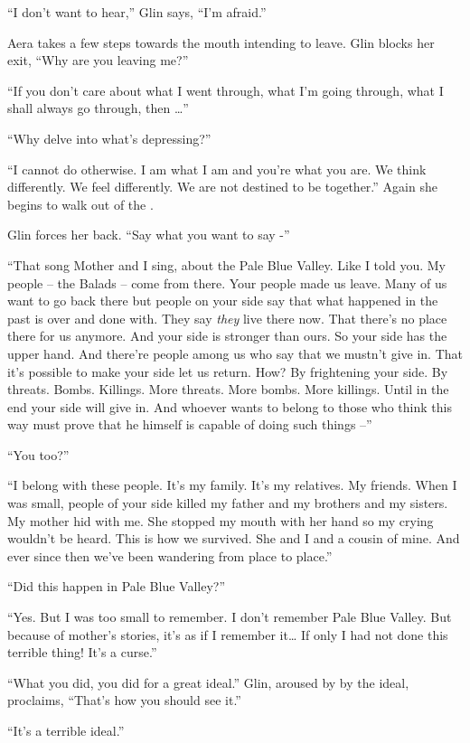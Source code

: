 \documentclass[twoside,11pt]{book}
\begin{document}
``I don't want to hear,'' Glin says, ``I'm afraid.''

Aera takes a few steps towards the mouth intending to leave. Glin blocks her exit, ``Why
are you leaving me?''

``If you don't care about what I went through, what I'm going through, what I shall always go through, then
{\dots}''

``Why delve into what's depressing?''

``I cannot do otherwise. I am what I am and you're what you are. We think differently. We feel differently.
We are not destined to be together.'' Again she begins to walk out of the .

Glin forces her back. ``Say what you want to say -''

``That song Mother and I sing, about the Pale Blue Valley. Like I told you. My people -- the Balads -- come
from there. Your people made us leave. Many of us want to go back there but people on your side say that what happened
in the past is over and done with.  They say \textit{they} live there now. That there's no place there for us anymore.
And your side is stronger than ours. So your side has the upper hand. And there're people among us who say that we
mustn't give in. That it's possible to make your side let us return. How? By frightening your side. By threats. Bombs.
Killings. More threats. More bombs. More killings. Until in the end your side will give in. And whoever wants to belong
to those who think this way must prove that he himself is capable of  doing such things --''

``You too?''

``I belong with these people. It's my family. It's my relatives. My friends. When I was small, people of
your side killed my father and my brothers and my sisters. My mother hid with me. She stopped my mouth with her hand so
my crying wouldn't be heard. This is how we survived. She and I and a cousin of mine. And ever since then we've been
wandering from place to place.''

``Did this happen in Pale Blue Valley?''

``Yes. But I was too small to remember. I don't remember Pale Blue Valley.  But because of mother's
stories, it's as if I remember it{\dots} If only I had not done this terrible thing! It's a curse.''

``What you did, you did for a great ideal.'' Glin, aroused by by the ideal, proclaims,
``That's how you should see it.''

``It's a terrible ideal.''
\end{document}
